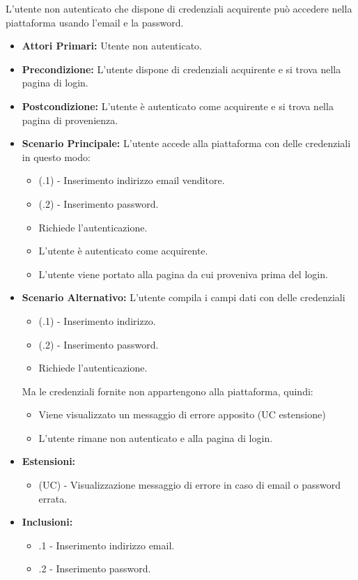 L'utente non autenticato che dispone di credenziali acquirente può accedere nella piattaforma usando l'email e la password.
\begin{itemize}
	\item \textbf{Attori Primari:} Utente non autenticato.
	\item \textbf{Precondizione:} L'utente dispone di credenziali acquirente e si trova nella pagina di login.
	\item \textbf{Postcondizione:} L'utente è autenticato come acquirente e si trova nella pagina di provenienza.
	\item \textbf{Scenario Principale:} L'utente accede alla piattaforma con delle credenziali in questo modo:
	\begin{itemize}
		\item (\actualUC.1) - Inserimento indirizzo email venditore.
		\item (\actualUC.2) - Inserimento password.
		\item Richiede l'autenticazione.
		\item L'utente è autenticato come acquirente.
		\item L'utente viene portato alla pagina da cui proveniva prima del login.
	\end{itemize}
	\item \textbf{Scenario Alternativo:} L'utente compila i campi dati con delle credenziali 
	\begin{itemize}
		\item (\actualUC.1) - Inserimento indirizzo.
		\item (\actualUC.2) - Inserimento password.
		\item Richiede l'autenticazione.
	\end{itemize}
	Ma le credenziali fornite non appartengono alla piattaforma, quindi:
	\begin{itemize}
		\item Viene visualizzato un messaggio di errore apposito (UC estensione)
		\item L'utente rimane non autenticato e alla pagina di login.
	\end{itemize}
	\item \textbf{Estensioni:}
	\begin{itemize}
		\item (UC) - Visualizzazione messaggio di errore in caso di email o password errata.
	\end{itemize}
	\item \textbf{Inclusioni:}
	\begin{itemize}
		\item \actualUC.1 - Inserimento indirizzo email.
		\item \actualUC.2 - Inserimento  password. 
		\end{itemize}
\end{itemize}

